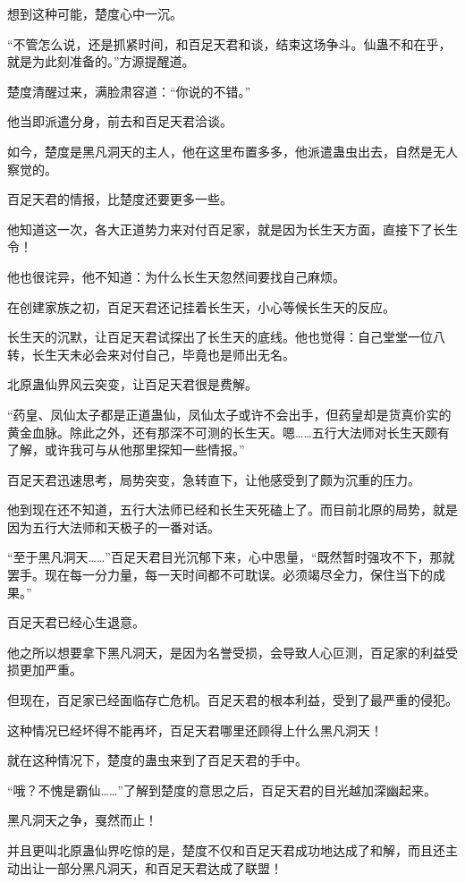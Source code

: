 \begin{this_body}
想到这种可能，楚度心中一沉。

“不管怎么说，还是抓紧时间，和百足天君和谈，结束这场争斗。仙蛊不和在乎，就是为此刻准备的。”方源提醒道。

楚度清醒过来，满脸肃容道：“你说的不错。”

他当即派遣分身，前去和百足天君洽谈。

如今，楚度是黑凡洞天的主人，他在这里布置多多，他派遣蛊虫出去，自然是无人察觉的。

百足天君的情报，比楚度还要更多一些。

他知道这一次，各大正道势力来对付百足家，就是因为长生天方面，直接下了长生令！

他也很诧异，他不知道：为什么长生天忽然间要找自己麻烦。

在创建家族之初，百足天君还记挂着长生天，小心等候长生天的反应。

长生天的沉默，让百足天君试探出了长生天的底线。他也觉得：自己堂堂一位八转，长生天未必会来对付自己，毕竟也是师出无名。

北原蛊仙界风云突变，让百足天君很是费解。

“药皇、凤仙太子都是正道蛊仙，凤仙太子或许不会出手，但药皇却是货真价实的黄金血脉。除此之外，还有那深不可测的长生天。嗯……五行大法师对长生天颇有了解，或许我可与从他那里探知一些情报。”

百足天君迅速思考，局势突变，急转直下，让他感受到了颇为沉重的压力。

他到现在还不知道，五行大法师已经和长生天死磕上了。而目前北原的局势，就是因为五行大法师和天极子的一番对话。

“至于黑凡洞天……”百足天君目光沉郁下来，心中思量，“既然暂时强攻不下，那就罢手。现在每一分力量，每一天时间都不可耽误。必须竭尽全力，保住当下的成果。”

百足天君已经心生退意。

他之所以想要拿下黑凡洞天，是因为名誉受损，会导致人心叵测，百足家的利益受损更加严重。

但现在，百足家已经面临存亡危机。百足天君的根本利益，受到了最严重的侵犯。

这种情况已经坏得不能再坏，百足天君哪里还顾得上什么黑凡洞天！

就在这种情况下，楚度的蛊虫来到了百足天君的手中。

“哦？不愧是霸仙……”了解到楚度的意思之后，百足天君的目光越加深幽起来。

黑凡洞天之争，戛然而止！

并且更叫北原蛊仙界吃惊的是，楚度不仅和百足天君成功地达成了和解，而且还主动出让一部分黑凡洞天，和百足天君达成了联盟！


\end{this_body}
